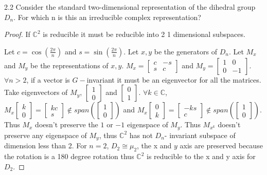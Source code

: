 \documentclass{article}
\newcommand{\C}{\mathbb{C}}
\begin{document}
\bigskip

\begin{PROB}{2.2}\label{Problem 2.2.}
    Consider the standard two-dimensional representation of the dihedral group $D_{n}$. For which n is this an irreducible complex representation?
\end{PROB}
\begin{proof}
    If $\C^2$ is reducible it must be reducible into 2 1 dimensional subspaces. 

    Let $c = \cos\left(\frac{2 \pi}{n}\right)$ and $s = \sin\left(\frac{2 \pi}{n}\right)$. Let $x, y$ be the generators of $D_n$. Let $M_x$ and $M_y$ be the representations of $x, y$. $M_x = \begin{bmatrix}
        c & -s \\ s & c
    \end{bmatrix}$ and $M_y = \begin{bmatrix}
        1 & 0 \\ 0 & -1
    \end{bmatrix}$. $\forall n > 2$, if a vector is $G-$invariant it must be an eigenvector for all the matrices. Take eigenvectors of $M_y$, $\begin{bmatrix}
        1 \\ 0
    \end{bmatrix}$ and $\begin{bmatrix}
        0 \\ 1
    \end{bmatrix}$. $\forall k \in \C$, $M_x \begin{bmatrix}
        k \\ 0
    \end{bmatrix} = \begin{bmatrix}
        kc \\ s
    \end{bmatrix} \not \in span(\begin{bmatrix}
        1 \\ 0
    \end{bmatrix})$ and $M_x \begin{bmatrix}
        0 \\ k
    \end{bmatrix} = \begin{bmatrix}
        -ks \\ c
    \end{bmatrix} \not \in span(\begin{bmatrix}
        1 \\ 0
    \end{bmatrix})$. Thus $M_x$ doesn't preserve the $1$ or $-1$ eigenspace of $M_y$. Thus $M_{x^k}$ doesn't preserve any eigenspace of $M_y$, thus $\C^2$ has not $D_n$- invariant subspace of dimension less than 2. For $n = 2$, $D_2 \cong \mu_2$, the x and $y$ axis are preserved because the rotation is a 180 degree rotation thus $\C^2$ is reducible to the x and y axis for $D_2$.                       
\end{proof}
\end{document}
